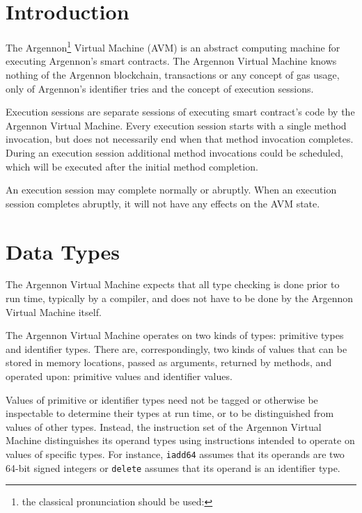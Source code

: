 

\section{Introduction}\label{sec:introduction}

The Argennon\footnote{the classical pronunciation should be used:} Virtual Machine (AVM) is an
abstract computing machine for executing Argennon's smart contracts. The
Argennon Virtual Machine knows nothing of the Argennon blockchain, transactions or any concept of gas usage, only of
Argennon's identifier tries and the concept of execution sessions.

Execution sessions are separate sessions of executing smart contract's code by the Argennon Virtual Machine.
Every execution session starts with a single method invocation, but does not necessarily end when
that method invocation completes. During an execution session additional method invocations could be scheduled,
which will be executed after the initial method completion.

An execution session may complete normally or abruptly. When an execution session completes abruptly, it will
not have any effects on the AVM state.

\section{Data Types}\label{sec:data-types}

The Argennon Virtual Machine expects that all type checking is done prior to run time, typically by a compiler,
and does not have to be done by the Argennon Virtual Machine itself.

The Argennon Virtual Machine operates on two kinds of types: primitive types and identifier types. There are,
correspondingly, two kinds of values that can be stored in memory locations, passed as arguments, returned by
methods, and operated upon: primitive values and identifier values.

Values of primitive or identifier types need not be tagged or otherwise be inspectable to determine their types
at run time, or to be distinguished from values of other types. Instead, the instruction set of the Argennon
Virtual Machine distinguishes its operand types using instructions intended to operate on values of specific
types. For instance, \texttt{iadd64} assumes that its operands are two 64-bit signed integers or \texttt{delete}
assumes that its operand is an identifier type.

